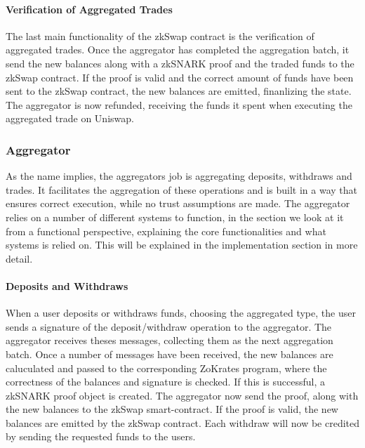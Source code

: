 \documentclass[../../thesis.tex]{subfiles}
\begin{document}
\paragraph{Verification of Aggregated Trades}
The last main functionality of the zkSwap contract is the verification of aggregated trades. Once the aggregator has completed the aggregation batch, it send the new balances along with a zkSNARK proof and the traded funds to the zkSwap contract. If the proof is valid and the correct amount of funds have been sent to the zkSwap contract, the new balances are emitted, finanlizing the state. The aggregator is now refunded, receiving the funds it spent when executing the aggregated trade on Uniswap.

\subsubsection{Aggregator}
As the name implies, the aggregators job is aggregating deposits, withdraws and trades. It facilitates the aggregation of these operations and is built in a way that ensures correct execution, while no trust assumptions are made. The aggregator relies on a number of different systems to function, in the section we look at it from a functional perspective, explaining the core functionalities and what systems is relied on. This will be explained in the implementation section in more detail.

\paragraph{Deposits and Withdraws}
When a user deposits or withdraws funds, choosing the aggregated type, the user sends a signature of the deposit/withdraw operation to the aggregator. The aggregator receives theses messages, collecting them as the next aggregation batch. Once a number of messages have been received, the new balances are caluculated and passed to the corresponding ZoKrates program, where the correctness of the balances and signature is checked. If this is successful, a zkSNARK proof object is created. The aggregator now send the proof, along with the new balances to the zkSwap smart-contract. If the proof is valid, the new balances are emitted by the zkSwap contract. Each withdraw will now be credited by sending the requested funds to the users. 
\end{document}
